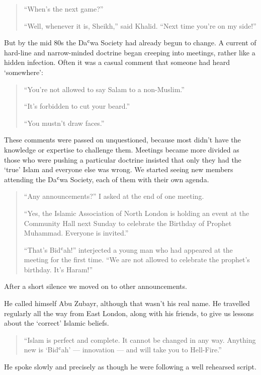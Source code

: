 \documentclass[12pt]{memoir}
\def\`{ʿ} %
\begin{document}
\begin{quote}
“When’s the next game?”

“Well, whenever it is, Sheikh,” said Khalid.
“Next time you’re on my side!”
\end{quote}

But by the mid 80s the Da\`wa Society had already begun to change.
A current of hard-line and narrow-minded doctrine began creeping into meetings,
rather like a hidden infection.
Often it was a casual comment that someone had heard ‘somewhere’:

\begin{quote}
“You’re not allowed to say Salam to a non-Muslim.”

“It’s forbidden to cut your beard.”

“You mustn’t draw faces.”
\end{quote}

These comments were passed on unquestioned,
because most didn’t have the knowledge or expertise to challenge them.
Meetings became more divided as those who were pushing a particular doctrine
insisted that only they had the ‘true’ Islam and everyone else was wrong.
We started seeing new members attending the Da\`wa Society,
each of them with their own agenda.

\begin{quote}
“Any announcements?” I asked at the end of one meeting.

“Yes, the Islamic Association of North London is holding
an event at the Community Hall next Sunday
to celebrate the Birthday of Prophet Muhammad.
Everyone is invited.”

“That’s Bid\`ah!” interjected a young man
who had appeared at the meeting for the first time.
“We are not allowed to celebrate the prophet’s birthday.
It’s Haram!”
\end{quote}

After a short silence we moved on to other announcements.

He called himself Abu Zubayr, although that wasn’t his real name.
He travelled regularly all the way from East London, along with his friends,
to give us lessons about the ‘correct’ Islamic beliefs.

\begin{quote}
“Islam is perfect and complete.
It cannot be changed in any way.
Anything new is ‘Bid\`ah’ — innovation — and will take you to Hell-Fire.”
\end{quote}

He spoke slowly and precisely
as though he were following a well rehearsed script.
\end{document}

